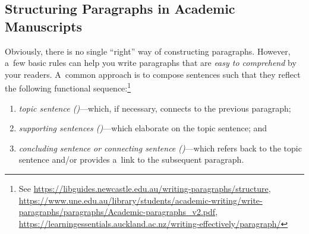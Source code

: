 \subsection{Structuring Paragraphs in Academic Manuscripts}

\begingroup

\setul{0.3ex}{0.5ex}


Obviously, there is no single ``right'' way of constructing paragraphs. However, a~few basic rules can help you write paragraphs that are \emph{easy to comprehend} by your readers. A~common approach is to compose sentences such that they reflect the following functional sequence:\footnote{See \url{https://libguides.newcastle.edu.au/writing-paragraphs/structure}, \url{https://www.une.edu.au/library/students/academic-writing/write-paragraphs/paragraphs/Academic-paragraphs_v2.pdf}, \url{https://learningessentials.auckland.ac.nz/writing-effectively/paragraph/}}
\begin{enumerate}
	\item \emph{topic sentence ()}---which, if necessary, connects to the previous paragraph;
	\item \emph{supporting sentences ()}---which elaborate on the topic sentence; and
	\item \emph{concluding sentence or connecting sentence ()}---which refers back to the topic sentence and\slash or provides a~link to the subsequent paragraph.
\end{enumerate}

